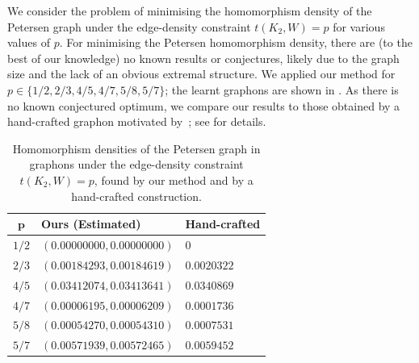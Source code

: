 \documentclass{article}
\theoremstyle{plain}
\theoremstyle{definition}
\theoremstyle{remark}
\begin{document}
We consider the problem of minimising the homomorphism density of the Petersen graph under the edge-density constraint $t(K_2, W) = p$ for various values of $p$.
For minimising the Petersen homomorphism density, there are (to the best of our knowledge) no known results or conjectures, likely due to the graph size and the lack of an obvious extremal structure.
We applied our method for $p \in \{1/2, 2/3, 4/5, 4/7, 5/8, 5/7\}$; the learnt graphons are shown in .
As there is no known conjectured optimum, we compare our results to those obtained by a hand-crafted graphon motivated by~\citet{razborov2008minimal}; see  for details.

\begin{table}[t]
    \centering
  \caption{Homomorphism densities of the Petersen graph in graphons under the edge-density constraint $t(K_2, W)=p$, found by our method and by a hand-crafted construction. \label{tab:petersenresult2}}
  {\small
    \begin{tabular}{cll}
         \toprule
         $\mathbf{p}$ & \textbf{Ours (Estimated)} & \textbf{Hand-crafted} 
         \\ \midrule
         $1/2$ & $(\mathit{0.00000000}, \mathit{0.00000000})$ & $0$
         \\
         $2/3$ & $(\mathit{0.00184293}, \mathit{0.00184619})$ & $0.0020322$
         \\
         $4/5$ & $(\mathit{0.03412074}, \mathit{0.03413641})$ & $0.0340869$
         \\
         $4/7$ & $(\mathit{0.00006195}, \mathit{0.00006209})$ & $0.0001736$
         \\
         $5/8$ & $(\mathit{0.00054270}, \mathit{0.00054310})$ & $0.0007531$
         \\
         $5/7$ & $(\mathit{0.00571939}, \mathit{0.00572465})$ & $0.0059452$
         \\
         \bottomrule
    \end{tabular}
    }
\end{table}
\end{document}
